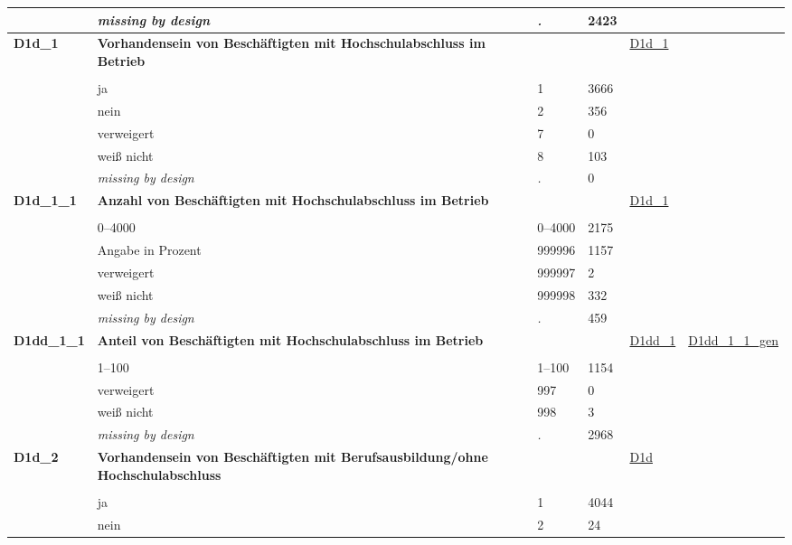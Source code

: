 \begin{longtable}{| L{2.45cm} | L{6cm} | C{1.5cm} | R{1cm} | C{2.25cm} | C{2.25cm} |}
   & \textit{missing by design} & \textit{.} & 2423 &  &  \\ 
   \midrule
\textbf{D1d\_1}\label{var:D1d:1} & \textbf{Vorhandensein von Beschäftigten mit Hochschulabschluss im Betrieb} &  &  & \hyperref[D1d:1]{D1d\_1} & \hyperref[var:suf:]{} \\ 
   &  &  &  &  &  \\ 
   & ja & 1 & 3666 &  &  \\ 
   & nein & 2 & 356 &  &  \\ 
   & verweigert & 7 & 0 &  &  \\ 
   & weiß nicht & 8 & 103 &  &  \\ 
   & \textit{missing by design} & \textit{.} & 0 &  &  \\ 
   \midrule
\textbf{D1d\_1\_1}\label{var:D1d:1:1} & \textbf{Anzahl von Beschäftigten mit Hochschulabschluss im Betrieb} &  &  & \hyperref[D1d:1]{D1d\_1} & \hyperref[var:suf:]{} \\ 
   &  &  &  &  &  \\ 
   & 0--4000 & 0--4000 & 2175 &  &  \\ 
   & Angabe in Prozent & 999996 & 1157 &  &  \\ 
   & verweigert & 999997 & 2 &  &  \\ 
   & weiß nicht & 999998 & 332 &  &  \\ 
   & \textit{missing by design} & \textit{.} & 459 &  &  \\ 
   \midrule
\textbf{D1dd\_1\_1}\label{var:D1dd:1:1} & \textbf{Anteil von Beschäftigten mit Hochschulabschluss im Betrieb} &  &  & \hyperref[D1dd:1]{D1dd\_1} & \hyperref[var:suf:D1dd:1:1:gen]{D1dd\_1\_1\_gen} \\ 
   &  &  &  &  &  \\ 
   & 1--100 & 1--100 & 1154 &  &  \\ 
   & verweigert & 997 & 0 &  &  \\ 
   & weiß nicht & 998 & 3 &  &  \\ 
   & \textit{missing by design} & \textit{.} & 2968 &  &  \\ 
   \midrule
\textbf{D1d\_2}\label{var:D1d:2} & \textbf{Vorhandensein von Beschäftigten mit Berufsausbildung/ohne Hochschulabschluss} &  &  & \hyperref[D1d]{D1d} & \hyperref[var:suf:]{} \\ 
   &  &  &  &  &  \\ 
   & ja & 1 & 4044 &  &  \\ 
   & nein & 2 & 24 &  &  \\ 

\end{longtable}
